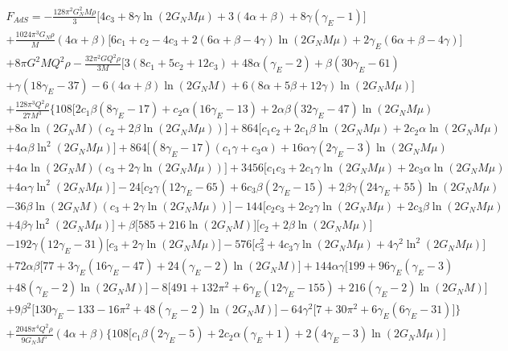 \documentclass[10pt,a4paper]{article}
\begin{document}
\begin{multline}
F_{AdS}=-\frac{128\pi^2G^2_NM\rho}{3}\Big[4c_3+8\gamma\ln(2G_NM\mu)+3(4\alpha+\beta)+8\gamma(\gamma_E-1)\Big]\\
+\frac{1024\pi^3G_N\rho}{M}(4\alpha+\beta)\Big[6c_1+c_2-4c_3+2(6\alpha+\beta-4\gamma)\ln(2G_NM\mu)+2\gamma_E(6\alpha+\beta-4\gamma)\Big]\\
+8\pi G^2M Q^2\rho-\frac{32\pi^2 G Q^2\rho}{3M}\Big[3(8c_1+5c_2+12c_3)+48\alpha(\gamma_E-2)+\beta(30\gamma_E-61)\\
+\gamma(18\gamma_E-37)-6(4\alpha+\beta)\ln(2G_NM)+6(8\alpha+5\beta+12\gamma)\ln(2G_NM\mu)\Big]\\
+\frac{128\pi^3Q^2\rho}{27M^3}\bigg\{108\Big[2c_1\beta(8\gamma_E-17)+c_2\alpha(16\gamma_E-13)+2\alpha\beta(32\gamma_E-47)\ln(2G_NM\mu)\\
+8\alpha\ln(2G_NM)\left(c_2+2\beta\ln(2G_NM\mu)\right)\Big]+864\Big[c_1c_2+2c_1\beta\ln(2G_NM\mu)+2c_2\alpha\ln(2G_NM\mu)\\
+4\alpha\beta\ln^2(2G_NM\mu)\Big]+864\Big[(8\gamma_E-17)(c_1\gamma+c_3\alpha)+16\alpha\gamma(2\gamma_E-3)\ln(2G_NM\mu)\\
+4\alpha\ln(2G_NM)\left(c_3+2\gamma\ln(2G_NM\mu)\right)\Big]+3456\Big[c_1c_3+2c_1\gamma\ln(2G_NM\mu)+2c_3\alpha\ln(2G_NM\mu)\\
+4\alpha\gamma\ln^2(2G_NM\mu)\Big]-24\Big[c_2\gamma(12\gamma_E-65)+6c_3\beta(2\gamma_E-15)+2\beta\gamma(24\gamma_E+55)\ln(2G_NM\mu)\\
-36\beta\ln(2G_NM)\left(c_3+2\gamma\ln(2G_NM\mu)\right)\Big]-144\Big[c_2c_3+2c_2\gamma\ln(2G_NM\mu)+2c_3\beta\ln(2G_NM\mu)\\
+4\beta\gamma\ln^2(2G_NM\mu)\Big]+\beta\Big[585+216\ln(2G_NM)\Big]\Big[c_2+2\beta\ln(2G_NM\mu)\Big]\\
-192\gamma(12\gamma_E-31)\Big[c_3+2\gamma\ln(2G_NM\mu)\Big]-576\Big[c^2_3+4c_3\gamma\ln(2G_NM\mu)+4\gamma^2\ln^2(2G_NM\mu)\Big]\\
+72\alpha\beta\Big[77+3\gamma_E(16\gamma_E-47)+24(\gamma_E-2)\ln(2G_NM)\Big]+144\alpha\gamma\Big[199+96\gamma_E(\gamma_E-3)\\
+48(\gamma_E-2)\ln(2G_NM)\Big]-8\Big[491+132\pi^2+6\gamma_E(12\gamma_E-155)+216(\gamma_E-2)\ln(2G_NM)\Big]\\
+9\beta^2\Big[130\gamma_E-133-16\pi^2+48(\gamma_E-2)\ln(2G_NM)\Big]-64\gamma^2\Big[7+30\pi^2+6\gamma_E(6\gamma_E-31)\Big]\bigg\}\\
+\frac{2048\pi^4Q^2\rho}{9G_NM^5}(4\alpha+\beta)\bigg\{108\Big[c_1\beta(2\gamma_E-5)+2c_2\alpha(\gamma_E+1)+2(4\gamma_E-3)\ln(2G_NM\mu)\Big]\\

\end{multline}
\end{document}
